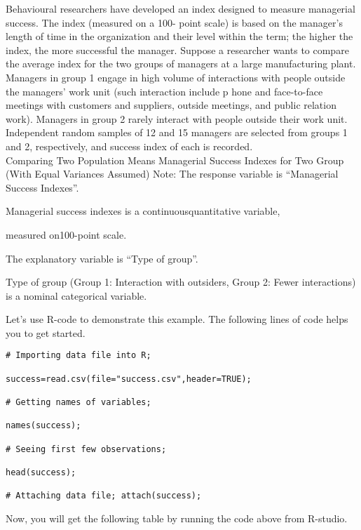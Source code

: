 \begin{example}
Behavioural researchers have developed an index designed to measure managerial success. The index (measured on a 100- point scale) is based on the manager’s length of time in the organization and their level within the term; the higher the index, the more successful the manager. Suppose a researcher wants to compare the average index for the two groups of managers at a large manufacturing plant. Managers in group 1 engage in high volume of interactions with people outside the managers’ work unit (such interaction include p hone and face-to-face meetings with customers and suppliers, outside meetings, and public relation work). Managers in group 2 rarely interact with people outside their work unit. Independent random samples of 12 and 15 managers are selected from groups 1 and 2, respectively, and success index of each is recorded.\\
Comparing Two Population Means Managerial Success Indexes for Two Group (With Equal Variances Assumed) Note: The response variable is “Managerial Success Indexes”.

Managerial success indexes is a continuousquantitative variable,

measured on100-point scale.

The explanatory variable is “Type of group”.

Type of group (Group 1: Interaction with outsiders, Group 2: Fewer interactions) is a nominal categorical variable.
\end{example}

Let's use R-code to demonstrate this example. The following lines of code helps you to get started.

\begin{tcolorbox}[colback=gray!10, colframe=gray!50, arc=2mm]
\begin{verbatim}
# Importing data file into R;

success=read.csv(file="success.csv",header=TRUE);

# Getting names of variables;

names(success);

# Seeing first few observations;

head(success);

# Attaching data file; attach(success);
\end{verbatim}
\end{tcolorbox}

Now, you will get the following table by running the code above from R-studio.

